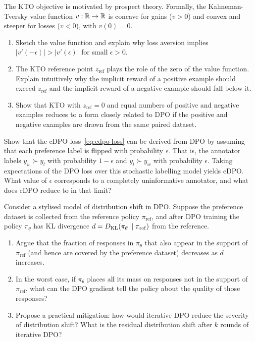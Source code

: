 \begin{exercise}
\label{ex:kto-prospect}
The KTO objective is motivated by prospect theory. Formally, the Kahneman-Tversky value function $v : \mathbb{R} \to \mathbb{R}$ is concave for gains ($v > 0$) and convex and steeper for losses ($v < 0$), with $v(0) = 0$.
\begin{enumerate}
  \item Sketch the value function and explain why loss aversion implies $|v'(-\epsilon)| > |v'(\epsilon)|$ for small $\epsilon > 0$.
  \item The KTO reference point $z_\mathrm{ref}$ plays the role of the zero of the value function. Explain intuitively why the implicit reward of a positive example should exceed $z_\mathrm{ref}$ and the implicit reward of a negative example should fall below it.
  \item Show that KTO with $z_\mathrm{ref} = 0$ and equal numbers of positive and negative examples reduces to a form closely related to DPO if the positive and negative examples are drawn from the same paired dataset.
\end{enumerate}
\end{exercise}

\begin{exercise}
\label{ex:cdpo-label-smooth}
Show that the cDPO loss~\eqref{eq:cdpo-loss} can be derived from DPO by assuming that each preference label is flipped with probability $\epsilon$. That is, the annotator labels $y_w \succ y_l$ with probability $1-\epsilon$ and $y_l \succ y_w$ with probability $\epsilon$. Taking expectations of the DPO loss over this stochastic labelling model yields cDPO. What value of $\epsilon$ corresponds to a completely uninformative annotator, and what does cDPO reduce to in that limit?
\end{exercise}

\begin{exercise}
\label{ex:distribution-shift}
Consider a stylised model of distribution shift in DPO. Suppose the preference dataset is collected from the reference policy $\pi_\mathrm{ref}$, and after DPO training the policy $\pi_\theta$ has KL divergence $d = D_{\mathrm{KL}}\!\left(\pi_\theta\;\|\;\pi_\mathrm{ref}\right)$ from the reference.
\begin{enumerate}
  \item Argue that the fraction of responses in $\pi_\theta$ that also appear in the support of $\pi_\mathrm{ref}$ (and hence are covered by the preference dataset) decreases as $d$ increases.
  \item In the worst case, if $\pi_\theta$ places all its mass on responses not in the support of $\pi_\mathrm{ref}$, what can the DPO gradient tell the policy about the quality of those responses?
  \item Propose a practical mitigation: how would iterative DPO reduce the severity of distribution shift? What is the residual distribution shift after $k$ rounds of iterative DPO?
\end{enumerate}
\end{exercise}

